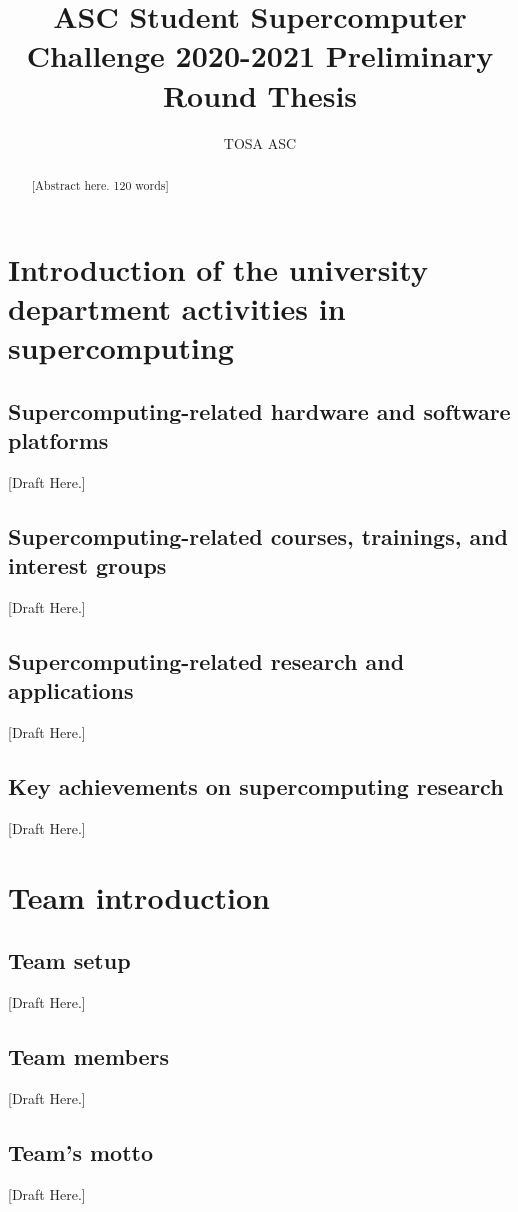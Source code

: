 \documentclass[a4paper, 11pt]{article}
\title{ASC Student Supercomputer Challenge 2020-2021 Preliminary Round Thesis}
\author{TOSA ASC}
\begin{document}
	\maketitle
	
	\begin{abstract}
		[Abstract here. 120 words]
	\end{abstract}
	
	\tableofcontents
	\newpage
	
	

	\section{Introduction of the university department activities in supercomputing}
		\subsection{Supercomputing-related hardware and software platforms} [Draft Here.]
		\subsection{Supercomputing-related courses, trainings, and interest groups} [Draft Here.]
		\subsection{Supercomputing-related research and applications} [Draft Here.]
		\subsection{Key achievements on supercomputing research} [Draft Here.]
	\section{Team introduction}
		\subsection{Team setup} [Draft Here.]
		\subsection{Team members} [Draft Here.]
		\subsection{Team’s motto} [Draft Here.]
		
\end{document}
